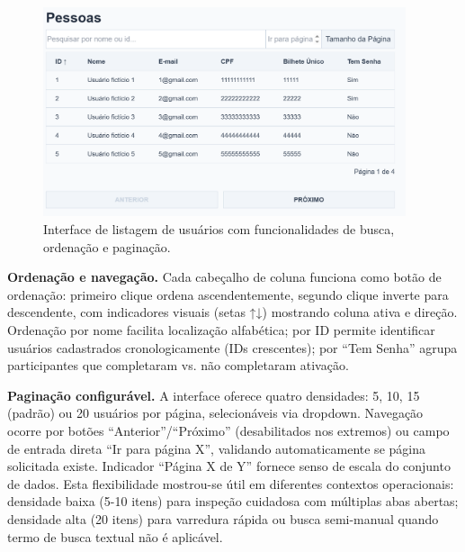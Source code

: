 \begin{figure}[H]
    \centering
    \includegraphics[width=0.95\textwidth]{figuras/pessoas.PNG}
    \caption{Interface de listagem de usuários com funcionalidades de busca, ordenação e paginação.}
    \label{fig:usuarios_listagem}
  \end{figure}

\textbf{Ordenação e navegação.} Cada cabeçalho de coluna funciona como botão de
ordenação: primeiro clique ordena ascendentemente, segundo clique inverte para
descendente, com indicadores visuais (setas ↑↓) mostrando coluna ativa e direção.
Ordenação por nome facilita localização alfabética; por ID permite identificar
usuários cadastrados cronologicamente (IDs crescentes); por ``Tem Senha'' agrupa
participantes que completaram vs. não completaram ativação.

\textbf{Paginação configurável.} A interface oferece quatro densidades: 5, 10, 15
(padrão) ou 20 usuários por página, selecionáveis via dropdown. Navegação ocorre por
botões ``Anterior''/``Próximo'' (desabilitados nos extremos) ou campo de entrada
direta ``Ir para página X'', validando automaticamente se página solicitada existe.
Indicador ``Página X de Y'' fornece senso de escala do conjunto de dados. Esta
flexibilidade mostrou-se útil em diferentes contextos operacionais: densidade baixa
(5-10 itens) para inspeção cuidadosa com múltiplas abas abertas; densidade alta
(20 itens) para varredura rápida ou busca semi-manual quando termo de busca textual
não é aplicável.

